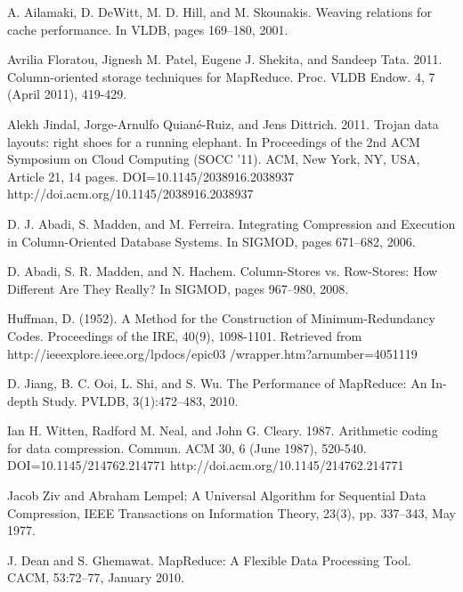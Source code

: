 \documentclass[twocolumn]{article}
\begin{document}
{\small
\begin{thebibliography}{10}

 A. Ailamaki, D. DeWitt, M. D. Hill, and M. Skounakis.
                Weaving relations for cache performance. In VLDB, pages
                169–180, 2001.

 Avrilia Floratou, Jignesh M. Patel, Eugene J. Shekita, and Sandeep
		Tata. 2011. Column-oriented storage techniques for MapReduce.
		Proc. VLDB Endow. 4, 7 (April 2011), 419-429.

 Alekh Jindal, Jorge-Arnulfo Quiané-Ruiz, and Jens Dittrich. 2011.
                Trojan data layouts: right shoes for a running elephant.
                In Proceedings of the 2nd ACM Symposium on Cloud Computing
                (SOCC '11). ACM, New York, NY, USA, Article 21, 14 pages.
                DOI=10.1145/2038916.2038937 http://doi.acm.org/10.1145/2038916.2038937

 D. J. Abadi, S. Madden, and M. Ferreira. Integrating
                Compression and Execution in Column-Oriented Database
                Systems. In SIGMOD, pages 671–682, 2006.

 D. Abadi, S. R. Madden, and N. Hachem. Column-Stores
                vs. Row-Stores: How Different Are They Really? In
                SIGMOD, pages 967–980, 2008.

 Huffman, D. (1952). A Method for the Construction of Minimum-Redundancy Codes.
	Proceedings of the IRE, 40(9), 1098-1101. Retrieved from
	http://ieeexplore.ieee.org/lpdocs/epic03 /wrapper.htm?arnumber=4051119

 D. Jiang, B. C. Ooi, L. Shi, and S. Wu. The Performance of
                MapReduce: An In-depth Study. PVLDB, 3(1):472–483,
                2010.

 Ian H. Witten, Radford M. Neal, and John G. Cleary. 1987.
                Arithmetic coding for data compression. Commun.
                ACM 30, 6 (June 1987), 520-540. DOI=10.1145/214762.214771
                http://doi.acm.org/10.1145/214762.214771

 Jacob Ziv and Abraham Lempel; A Universal Algorithm for Sequential
        	Data Compression, IEEE Transactions on Information Theory,
        	23(3), pp. 337–343, May 1977.

 J. Dean and S. Ghemawat. MapReduce: A Flexible Data
                Processing Tool. CACM, 53:72–77, January 2010.


\end{thebibliography}}
\end{document}
